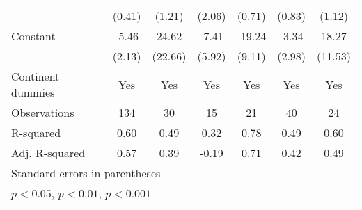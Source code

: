 {\begin{tabular}{l*{6}{c}}
                    &      (0.41)         &      (1.21)         &      (2.06)         &      (0.71)         &      (0.83)         &      (1.12)         \\
\addlinespace
Constant            &       -5.46\sym{*}  &       24.62         &       -7.41         &      -19.24         &       -3.34         &       18.27         \\
                    &      (2.13)         &     (22.66)         &      (5.92)         &      (9.11)         &      (2.98)         &     (11.53)         \\
\addlinespace
Continent dummies   &         Yes         &         Yes         &         Yes         &         Yes         &         Yes         &         Yes         \\
\midrule
Observations        &         134         &          30         &          15         &          21         &          40         &          24         \\
R-squared           &        0.60         &        0.49         &        0.32         &        0.78         &        0.49         &        0.60         \\
Adj. R-squared      &        0.57         &        0.39         &       -0.19         &        0.71         &        0.42         &        0.49         \\
\bottomrule
\multicolumn{7}{l}{\footnotesize Standard errors in parentheses}\\
\multicolumn{7}{l}{\footnotesize \sym{*} \(p<0.05\), \sym{**} \(p<0.01\), \sym{***} \(p<0.001\)}\\
\end{tabular}
}
